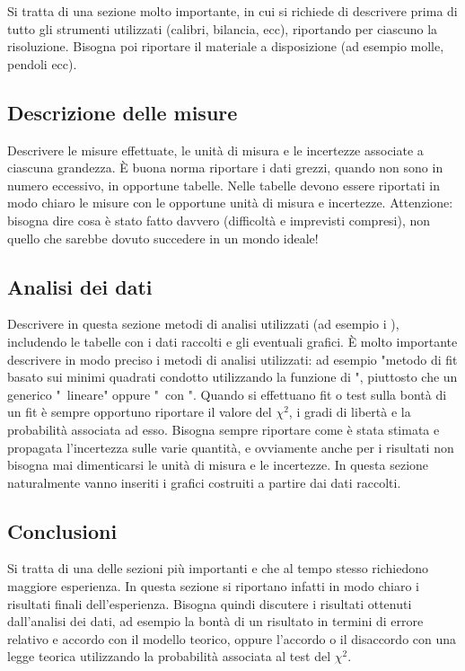 Si tratta di una sezione molto importante, in cui si richiede di descrivere
prima di tutto gli strumenti utilizzati (calibri, bilancia, ecc), riportando
per ciascuno la risoluzione. Bisogna poi riportare il materiale a disposizione
(ad esempio molle, pendoli ecc).


\subsection{Descrizione delle misure}

Descrivere le misure effettuate, le unità di misura e le incertezze associate
a ciascuna grandezza. \`E buona norma riportare i dati grezzi, quando non sono
in numero eccessivo, in opportune tabelle. Nelle tabelle devono essere
riportati in modo chiaro le misure con le opportune unità di misura e
incertezze. Attenzione: bisogna dire cosa è stato fatto davvero (difficoltà
e imprevisti compresi), non quello che sarebbe dovuto succedere in un mondo
ideale!


\subsection{Analisi dei dati}

Descrivere in questa sezione metodi di analisi utilizzati (ad esempio i
\fit), includendo le tabelle con i dati raccolti e gli eventuali grafici.
\`E molto importante descrivere in modo preciso i metodi di analisi utilizzati:
ad esempio "metodo di fit basato sui minimi quadrati condotto utilizzando la
funzione  di \python", piuttosto che un generico
"\fit\ lineare" oppure "\fit\ con \python". Quando si effettuano fit o test
sulla bontà di un fit è sempre opportuno riportare il valore del
$\chi^{2}$, i gradi di libertà e la probabilità associata ad esso.
Bisogna sempre riportare come è stata stimata e propagata l'incertezza sulle
varie quantità, e ovviamente anche per i risultati non bisogna mai
dimenticarsi le unità di misura e le incertezze. In questa sezione
naturalmente vanno inseriti i grafici costruiti a partire dai dati raccolti.


\subsection{Conclusioni}

Si tratta di una delle sezioni più importanti e che al tempo stesso
richiedono maggiore esperienza. In questa sezione si riportano infatti in modo
chiaro i risultati finali dell'esperienza. Bisogna quindi discutere i risultati
ottenuti dall'analisi dei dati, ad esempio la bontà di un risultato in
termini di errore relativo e accordo con il modello teorico, oppure l'accordo
o il disaccordo con una legge teorica utilizzando la probabilità associata al
test del $\chi^{2}$.

